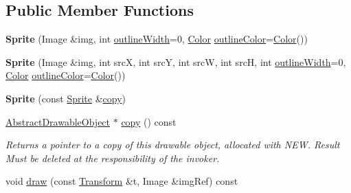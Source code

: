 \subsection*{Public Member Functions}
\begin{DoxyCompactItemize}
\item 
\mbox{\label{classcturtle_1_1Sprite_adca3803189c23c887a3f39de00db4bdd}} 
{\bfseries Sprite} (Image \&img, int \hyperlink{classcturtle_1_1AbstractDrawableObject_aeffaecc245057e9a42e5688671a77f52}{outline\+Width}=0, \hyperlink{classcturtle_1_1Color}{Color} \hyperlink{classcturtle_1_1AbstractDrawableObject_abd04640855e7623bb84b52babd8b32b6}{outline\+Color}=\hyperlink{classcturtle_1_1Color}{Color}())
\item 
\mbox{\label{classcturtle_1_1Sprite_a56cdc4cb92ae5a5108cb34c9c284ebb0}} 
{\bfseries Sprite} (Image \&img, int srcX, int srcY, int srcW, int srcH, int \hyperlink{classcturtle_1_1AbstractDrawableObject_aeffaecc245057e9a42e5688671a77f52}{outline\+Width}=0, \hyperlink{classcturtle_1_1Color}{Color} \hyperlink{classcturtle_1_1AbstractDrawableObject_abd04640855e7623bb84b52babd8b32b6}{outline\+Color}=\hyperlink{classcturtle_1_1Color}{Color}())
\item 
\mbox{\label{classcturtle_1_1Sprite_a818e253f4d3cbb268e753f5ceee12d1d}} 
{\bfseries Sprite} (const \hyperlink{classcturtle_1_1Sprite}{Sprite} \&\hyperlink{classcturtle_1_1Sprite_a96682206c9ba4d31e73526d657fd346b}{copy})
\item 
\mbox{\label{classcturtle_1_1Sprite_a96682206c9ba4d31e73526d657fd346b}} 
\hyperlink{classcturtle_1_1AbstractDrawableObject}{Abstract\+Drawable\+Object} $\ast$ \hyperlink{classcturtle_1_1Sprite_a96682206c9ba4d31e73526d657fd346b}{copy} () const
\begin{DoxyCompactList}\small\item\em Returns a pointer to a copy of this drawable object, allocated with N\+EW. Result Must be deleted at the responsibility of the invoker. \end{DoxyCompactList}\item 
void \hyperlink{classcturtle_1_1Sprite_a7b57808acc51a2610b7d33f542a7f838}{draw} (const \hyperlink{classcturtle_1_1Transform}{Transform} \&t, Image \&img\+Ref) const
\end{DoxyCompactItemize}

